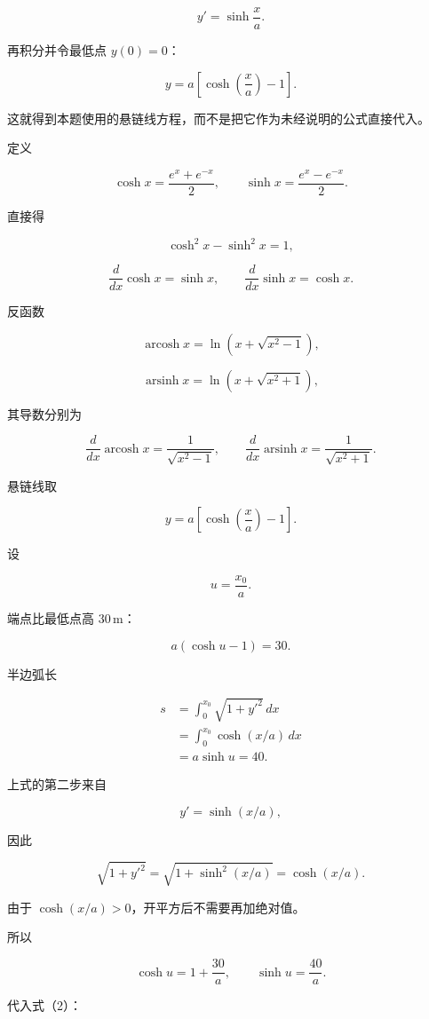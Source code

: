 \documentclass[12pt,a4paper,UTF8]{ctexart}
\begin{document}
\[
y'=\sinh\frac xa.
\]

再积分并令最低点 \(y(0)=0\)：

\[
y=a\left[\cosh\left(\frac xa\right)-1\right].
\]

这就得到本题使用的悬链线方程，而不是把它作为未经说明的公式直接代入。

定义

\[
\cosh x=\frac{e^x+e^{-x}}2,\qquad
\sinh x=\frac{e^x-e^{-x}}2.
\tag{1}
\]

直接得

\[
\cosh^2x-\sinh^2x=1,
\tag{2}
\]

\[
\frac d{dx}\cosh x=\sinh x,\qquad
\frac d{dx}\sinh x=\cosh x.
\tag{3}
\]

反函数

\[
\operatorname{arcosh}x
=\ln\left(x+\sqrt{x^2-1}\right),
\tag{4}
\]

\[
\operatorname{arsinh}x
=\ln\left(x+\sqrt{x^2+1}\right),
\tag{5}
\]

其导数分别为

\[
\frac d{dx}\operatorname{arcosh}x
=\frac1{\sqrt{x^2-1}},
\qquad
\frac d{dx}\operatorname{arsinh}x
=\frac1{\sqrt{x^2+1}}.
\tag{6}
\]

悬链线取

\[
y=a\left[\cosh\left(\frac xa\right)-1\right].
\tag{7}
\]

设

\[
u=\frac{x_0}{a}.
\tag{8}
\]

端点比最低点高 \(30\,\mathrm m\)：

\[
a(\cosh u-1)=30.
\tag{9}
\]

半边弧长

\[
\begin{aligned}
s
&=\int_0^{x_0}\sqrt{1+y'^2}\,dx\\
&=\int_0^{x_0}\cosh(x/a)\,dx\\
&=a\sinh u=40.
\end{aligned}
\tag{10}
\]

上式的第二步来自

\[
y'=\sinh(x/a),
\]

因此

\[
\sqrt{1+y'^2}
=\sqrt{1+\sinh^2(x/a)}
=\cosh(x/a).
\]

由于 \(\cosh(x/a)>0\)，开平方后不需要再加绝对值。

所以

\[
\cosh u=1+\frac{30}{a},
\qquad
\sinh u=\frac{40}{a}.
\tag{11}
\]

代入式（2）：
\end{document}
